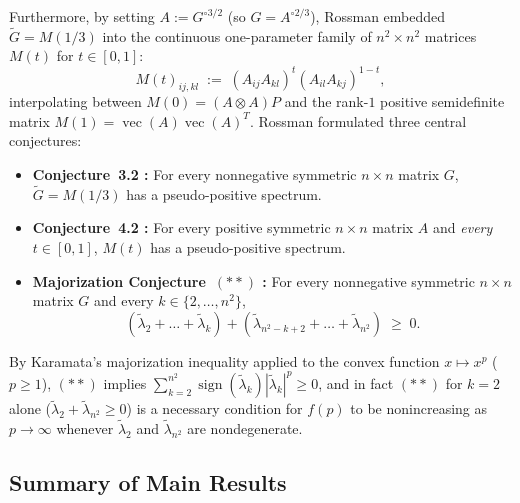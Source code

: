 \documentclass[11pt,a4paper]{article}
\theoremstyle{plain}
\theoremstyle{definition}
\theoremstyle{remark}
\DeclareMathOperator{\vecop}{vec}
\DeclareMathOperator{\sign}{sign}
\begin{document}
Furthermore, by setting $A := G^{\circ 3/2}$ (so $G = A^{\circ 2/3}$), Rossman embedded $\widetilde{G} = M(1/3)$ into the continuous one-parameter family of $n^2 \times n^2$ matrices $M(t)$ for $t \in [0, 1]$:
\begin{equation}\label{eq:Mt}
  M(t)_{ij,kl} \;:=\; (A_{ij} A_{kl})^t (A_{il} A_{kj})^{1-t},
\end{equation}
interpolating between $M(0) = (A \otimes A)P$ and the rank-$1$ positive semidefinite matrix $M(1) = \vecop(A)\vecop(A)^T$. Rossman formulated three central conjectures:
\begin{itemize}[nosep]
  \item \textbf{Conjecture~3.2 \cite{Rossman2025}:} For every nonnegative symmetric $n \times n$ matrix $G$, $\widetilde{G} = M(1/3)$ has a pseudo-positive spectrum.
  \item \textbf{Conjecture~4.2 \cite[Abstract \& \S4]{Rossman2025}:} For every positive symmetric $n \times n$ matrix $A$ and \emph{every} $t \in [0,1]$, $M(t)$ has a pseudo-positive spectrum.
  \item \textbf{Majorization Conjecture~$(**)$ \cite[\S6, p.~9]{Rossman2025}:} For every nonnegative symmetric $n \times n$ matrix $G$ and every $k \in \{2,\dots,n^2\}$,
  \begin{equation}\label{eq:double_star}
    (\widetilde{\lambda}_2 + \dots + \widetilde{\lambda}_k) + (\widetilde{\lambda}_{n^2-k+2} + \dots + \widetilde{\lambda}_{n^2}) \;\ge\; 0.
  \end{equation}
\end{itemize}
By Karamata's majorization inequality applied to the convex function $x \mapsto x^p$ ($p \ge 1$), $(**)$ implies $\sum_{k=2}^{n^2} \sign(\widetilde{\lambda}_k)|\widetilde{\lambda}_k|^p \ge 0$, and in fact $(**)$ for $k=2$ alone ($\widetilde{\lambda}_2 + \widetilde{\lambda}_{n^2} \ge 0$) is a necessary condition for $f(p)$ to be nonincreasing as $p \to \infty$ whenever $\widetilde{\lambda}_2$ and $\widetilde{\lambda}_{n^2}$ are nondegenerate.

\subsection{Summary of Main Results}
\end{document}
